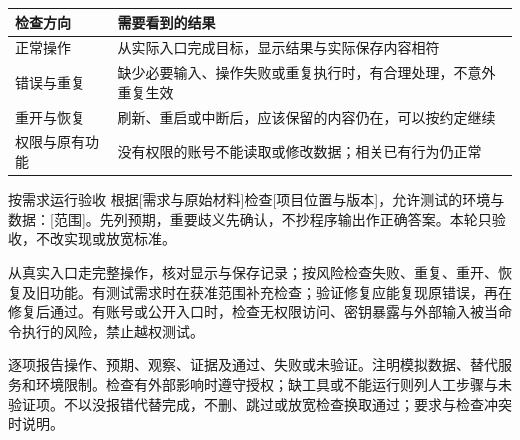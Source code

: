 \begin{tabularx}{\linewidth}{@{}L{30mm}Y@{}}
\toprule 检查方向 & 需要看到的结果\\\midrule
正常操作 & 从实际入口完成目标，显示结果与实际保存内容相符\\
错误与重复 & 缺少必要输入、操作失败或重复执行时，有合理处理，不意外重复生效\\
重开与恢复 & 刷新、重启或中断后，应该保留的内容仍在，可以按约定继续\\
权限与原有功能 & 没有权限的账号不能读取或修改数据；相关已有行为仍正常\\
\bottomrule\end{tabularx}
\begin{prompt}{按需求运行验收}
根据[需求与原始材料]检查[项目位置与版本]，允许测试的环境与数据：[范围]。先列预期，重要歧义先确认，不抄程序输出作正确答案。本轮只验收，不改实现或放宽标准。\par
从真实入口走完整操作，核对显示与保存记录；按风险检查失败、重复、重开、恢复及旧功能。有测试需求时在获准范围补充检查；验证修复应能复现原错误，再在修复后通过。有账号或公开入口时，检查无权限访问、密钥暴露与外部输入被当命令执行的风险，禁止越权测试。\par
逐项报告操作、预期、观察、证据及通过、失败或未验证。注明模拟数据、替代服务和环境限制。检查有外部影响时遵守授权；缺工具或不能运行则列人工步骤与未验证项。不以没报错代替完成，不删、跳过或放宽检查换取通过；要求与检查冲突时说明。
\end{prompt}

